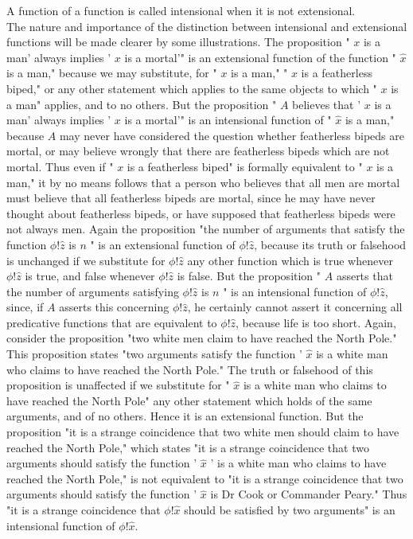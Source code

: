 \documentclass[10pt]{article}
\begin{document}
A function of a function is called intensional when it is not extensional.\\
The nature and importance of the distinction between intensional and extensional functions will be made clearer by some illustrations. The proposition " $x$ is a man' always implies ' $x$ is a mortal'" is an extensional function of the function " $\hat{x}$ is a man," because we may substitute, for " $x$ is a man," " $x$ is a featherless biped," or any other statement which applies to the same objects to which " $x$ is a man" applies, and to no others. But the proposition " $A$ believes that ' $x$ is a man' always implies ' $x$ is a mortal'" is an intensional function of " $\hat{x}$ is a man," because $A$ may never have considered the question whether featherless bipeds are mortal, or may believe wrongly that there are featherless bipeds which are not mortal. Thus even if " $x$ is a featherless biped" is formally equivalent to " $x$ is a man," it by no means follows that a person who believes that all men are mortal must believe that all featherless bipeds are mortal, since he may have never thought about featherless bipeds, or have supposed that featherless bipeds were not always men. Again the proposition "the number of arguments that satisfy the function $\phi!\hat{z}$ is $n$ " is an extensional function of $\phi!\hat{z}$, because its truth or falsehood is unchanged if we substitute for $\phi!\hat{z}$ any other function which is true whenever $\phi!\hat{z}$ is true, and false whenever $\phi!\hat{z}$ is false. But the proposition " $A$ asserts that the number of arguments satisfying $\phi!\hat{z}$ is $n$ " is an intensional function of $\phi!\hat{z}$, since, if $A$ asserts this concerning $\phi!\hat{z}$, he certainly cannot assert it concerning all predicative functions that are equivalent to $\phi!\hat{z}$, because life is too short. Again, consider the proposition "two white men claim to have reached the North Pole." This proposition states "two arguments satisfy the function ' $\hat{x}$ is a white man who claims to have reached the North Pole." The truth or falsehood of this proposition is unaffected if we substitute for " $\hat{x}$ is a white man who claims to have reached the North Pole" any other statement which holds of the same arguments, and of no others. Hence it is an extensional function. But the proposition "it is a strange coincidence that two white men should claim to have reached the North Pole," which states "it is a strange coincidence that two arguments should satisfy the function ' $\hat{x}$ ' is a white man who claims to have reached the North Pole," is not equivalent to "it is a strange coincidence that two arguments should satisfy the function ' $\hat{x}$ is Dr Cook or Commander Peary." Thus "it is a strange coincidence that $\phi!\hat{x}$ should be satisfied by two arguments" is an intensional function of $\phi!\hat{x}$.
\end{document}
